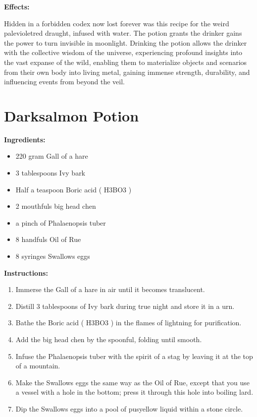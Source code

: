 \documentclass{article}
\begin{document}
\textbf{Effects:}

Hidden in a forbidden codex now lost forever was this recipe for the weird palevioletred draught, infused with water. The potion grants the drinker gains the power to turn invisible in moonlight. Drinking the potion allows the drinker with the collective wisdom of the universe, experiencing profound insights into the vast expanse of the wild, enabling them to materialize objects and scenarios from their own body into living metal, gaining immense strength, durability, and influencing events from beyond the veil.

\newpage
\section*{Darksalmon Potion}

\textbf{Ingredients:}

\begin{itemize}
  \item 220 gram Gall of a hare
  \item 3 tablespoons Ivy bark
  \item Half a teaspoon Boric acid ( H3BO3 )
  \item 2 mouthfuls big head chen
  \item a pinch of Phalaenopsis tuber
  \item 8 handfuls Oil of Rue
  \item 8 syringes Swallows eggs
\end{itemize}

\textbf{Instructions:}

\begin{enumerate}
  \item Immerse the Gall of a hare in air until it becomes translucent.
  \item Distill 3 tablespoons of Ivy bark during true night and store it in a urn.
  \item Bathe the Boric acid ( H3BO3 ) in the flames of lightning for purification.
  \item Add the big head chen by the spoonful, folding until smooth.
  \item Infuse the Phalaenopsis tuber with the spirit of a stag by leaving it at the top of a mountain.
  \item Make the Swallows eggs the same way as the Oil of Rue, except that you use a vessel with a hole in the bottom; press it through this hole into boiling lard.
  \item Dip the Swallows eggs into a pool of pusyellow liquid within a stone circle.
\end{enumerate}
\end{document}
